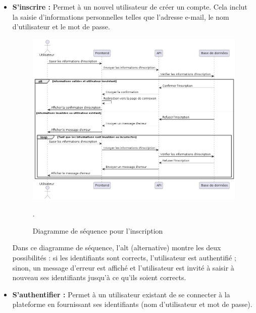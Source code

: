 \begin{itemize}
    \item \textbf{S'inscrire :} Permet à un nouvel utilisateur de créer un compte. Cela inclut la saisie d'informations personnelles telles que l'adresse e-mail, le nom d'utilisateur et le mot de passe.

    \begin{figure}[H]
        \centering
        \includegraphics[width=15cm]{gfx/fig-register-seq.png}
        \caption{Diagramme de séquence pour l'inscription}.
        \label{fig:register-sequence}
    \end{figure}

    Dans ce diagramme de séquence, l'alt (alternative) montre les deux possibilités : si les identifiants sont corrects, l'utilisateur est authentifié ; sinon, un message d'erreur est affiché et l'utilisateur est invité à saisir à nouveau ses identifiants jusqu'à ce qu'ils soient corrects.

    \newpage
    \item \textbf{S’authentifier :}  Permet à un utilisateur existant de se connecter à la plateforme en fournissant ses identifiants (nom d'utilisateur et mot de passe).


\end{itemize}

